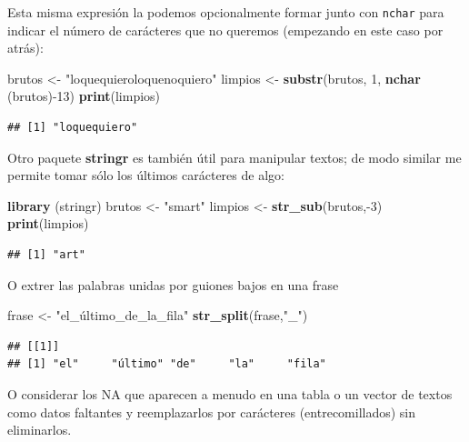 \documentclass[]{book}
\newenvironment{Shaded}{\begin{snugshade}}{\end{snugshade}}
\newcommand{\KeywordTok}[1]{\textcolor[rgb]{0.13,0.29,0.53}{\textbf{{#1}}}}
\newcommand{\DecValTok}[1]{\textcolor[rgb]{0.00,0.00,0.81}{{#1}}}
\newcommand{\StringTok}[1]{\textcolor[rgb]{0.31,0.60,0.02}{{#1}}}
\newcommand{\NormalTok}[1]{{#1}}
\theoremstyle{definition}
\theoremstyle{definition}
\theoremstyle{remark}
\begin{document}
Esta misma expresión la podemos opcionalmente formar junto con
\texttt{nchar} para indicar el número de carácteres que no queremos
(empezando en este caso por atrás):

\begin{Shaded}
\begin{Highlighting}[]
\NormalTok{brutos <-}\StringTok{ "loquequieroloquenoquiero"}
\NormalTok{limpios <-}\StringTok{ }\KeywordTok{substr}\NormalTok{(brutos, }\DecValTok{1}\NormalTok{, }\KeywordTok{nchar} \NormalTok{(brutos)-}\DecValTok{13}\NormalTok{)}
\KeywordTok{print}\NormalTok{(limpios)}
\end{Highlighting}
\end{Shaded}

\begin{verbatim}
## [1] "loquequiero"
\end{verbatim}

Otro paquete \textbf{stringr} \citep{R-stringr} es también útil para
manipular textos; de modo similar me permite tomar sólo los últimos
carácteres de algo:

\begin{Shaded}
\begin{Highlighting}[]
\KeywordTok{library} \NormalTok{(stringr)}
\NormalTok{brutos <-}\StringTok{ "smart"}
\NormalTok{limpios <-}\StringTok{ }\KeywordTok{str_sub}\NormalTok{(brutos,-}\DecValTok{3}\NormalTok{)}
\KeywordTok{print}\NormalTok{(limpios)}
\end{Highlighting}
\end{Shaded}

\begin{verbatim}
## [1] "art"
\end{verbatim}

O extrer las palabras unidas por guiones bajos en una frase

\begin{Shaded}
\begin{Highlighting}[]
\NormalTok{frase <-}\StringTok{ "el_último_de_la_fila"}
 \KeywordTok{str_split}\NormalTok{(frase,}\StringTok{"_"}\NormalTok{)}
\end{Highlighting}
\end{Shaded}

\begin{verbatim}
## [[1]]
## [1] "el"     "último" "de"     "la"     "fila"
\end{verbatim}

O considerar los NA que aparecen a menudo en una tabla o un vector de
textos como datos faltantes y reemplazarlos por carácteres
(entrecomillados) sin eliminarlos.
\end{document}
